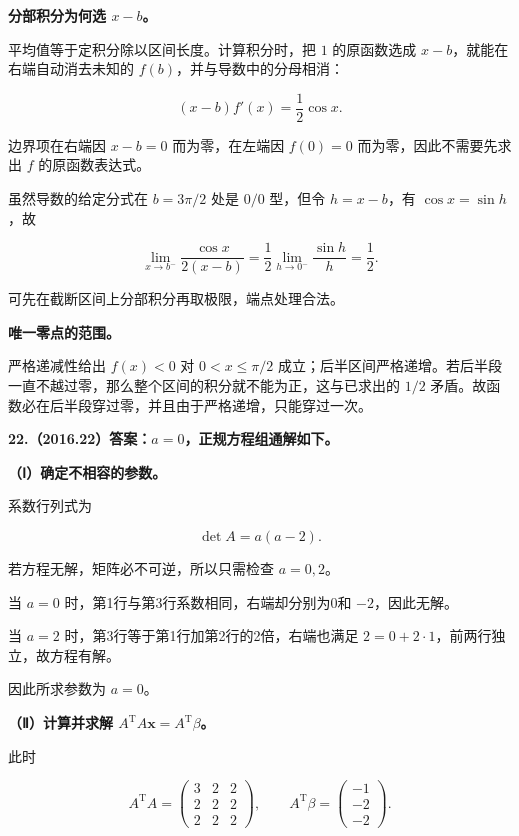 \documentclass[UTF8,11pt,fontset=windows]{ctexart}
\begin{document}
\textbf{分部积分为何选 $x-b$。}

平均值等于定积分除以区间长度。计算积分时，把 $1$ 的原函数选成 $x-b$，就能在右端自动消去未知的 $f(b)$，并与导数中的分母相消：

$$
(x-b)f'(x)=\frac12\cos x.
$$

边界项在右端因 $x-b=0$ 而为零，在左端因 $f(0)=0$ 而为零，因此不需要先求出 $f$ 的原函数表达式。

虽然导数的给定分式在 $b=3\pi/2$ 处是 $0/0$ 型，但令 $h=x-b$，有 $\cos x=\sin h$，故

$$
\lim_{x\to b^-}\frac{\cos x}{2(x-b)}
=\frac12\lim_{h\to0^-}\frac{\sin h}{h}=\frac12.
$$

可先在截断区间上分部积分再取极限，端点处理合法。

\textbf{唯一零点的范围。}

严格递减性给出 $f(x)<0$ 对 $0<x\le\pi/2$ 成立；后半区间严格递增。若后半段一直不越过零，那么整个区间的积分就不能为正，这与已求出的 $1/2$ 矛盾。故函数必在后半段穿过零，并且由于严格递增，只能穿过一次。

\clearpage

\textbf{22.（2016.22）答案：$a=0$，正规方程组通解如下。}

\textbf{（Ⅰ）确定不相容的参数。}

系数行列式为

$$
\det A=a(a-2).
$$

若方程无解，矩阵必不可逆，所以只需检查 $a=0,2$。

当 $a=0$ 时，第1行与第3行系数相同，右端却分别为0和 $-2$，因此无解。

当 $a=2$ 时，第3行等于第1行加第2行的2倍，右端也满足 $2=0+2\cdot1$，前两行独立，故方程有解。

因此所求参数为 $a=0$。

\textbf{（Ⅱ）计算并求解 $A^{\mathrm T}A\boldsymbol x=A^{\mathrm T}\beta$。}

此时

$$
A^{\mathrm T}A=\begin{pmatrix}3&2&2\\2&2&2\\2&2&2\end{pmatrix},
\qquad A^{\mathrm T}\beta=\begin{pmatrix}-1\\-2\\-2\end{pmatrix}.
$$
\end{document}
